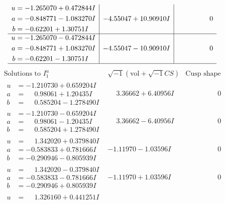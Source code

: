 \documentclass[1p]{elsarticle_modified}
\theoremstyle{definition}
\newcommand{\I}{\sqrt{-1}}
\begin{document}
$$\begin{array}{c|c|c}
\begin{aligned}
u &= -1.265070 + 0.472844 I \\
a &= -0.848771 - 1.083270 I \\
b &= -0.62201 + 1.30751 I\end{aligned}
 & -4.55047 + 10.90910 I & \phantom{-0.000000 } 0 \\ \hline\begin{aligned}
u &= -1.265070 - 0.472844 I \\
a &= -0.848771 + 1.083270 I \\
b &= -0.62201 - 1.30751 I\end{aligned}
 & -4.55047 - 10.90910 I & \phantom{-0.000000 } 0\\
 \hline 
 \end{array}$$\newpage$$\begin{array}{c|c|c}  
\text{Solutions to }I^u_{1}& \I (\text{vol} + \sqrt{-1}CS) & \text{Cusp shape}\\
 \hline 
\begin{aligned}
u &= -1.210730 + 0.659204 I \\
a &= \phantom{-}0.98061 + 1.20435 I \\
b &= \phantom{-}0.585204 - 1.278490 I\end{aligned}
 & \phantom{-}3.36662 + 6.40956 I & \phantom{-0.000000 } 0 \\ \hline\begin{aligned}
u &= -1.210730 - 0.659204 I \\
a &= \phantom{-}0.98061 - 1.20435 I \\
b &= \phantom{-}0.585204 + 1.278490 I\end{aligned}
 & \phantom{-}3.36662 - 6.40956 I & \phantom{-0.000000 } 0 \\ \hline\begin{aligned}
u &= \phantom{-}1.342020 + 0.379840 I \\
a &= -0.583833 + 0.781666 I \\
b &= -0.290946 - 0.805939 I\end{aligned}
 & -1.11970 - 1.03596 I & \phantom{-0.000000 } 0 \\ \hline\begin{aligned}
u &= \phantom{-}1.342020 - 0.379840 I \\
a &= -0.583833 - 0.781666 I \\
b &= -0.290946 + 0.805939 I\end{aligned}
 & -1.11970 + 1.03596 I & \phantom{-0.000000 } 0 \\ \hline\begin{aligned}
u &= \phantom{-}1.326160 + 0.441251 I \\

\end{aligned}
\end{array}$$
\end{document}
